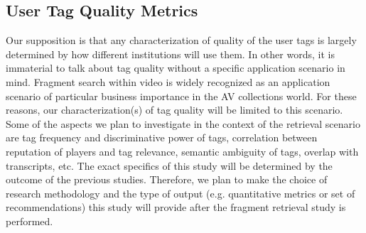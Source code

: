 

\subsection{User Tag Quality Metrics}\label{sec:quality}
Our supposition is that any characterization of quality of the user tags is largely determined by how different institutions will use them. In other words, it is immaterial to talk about tag quality without a specific application scenario in mind. Fragment search within video is widely recognized as an application scenario of particular business importance in the AV collections world. For these reasons, our characterization(s) of tag quality will be limited to this scenario.  Some of the aspects we plan to investigate in the context of the retrieval scenario are tag frequency and discriminative power of tags,  correlation between reputation of players and tag relevance,  semantic ambiguity of tags, overlap with transcripts,  etc. The exact specifics of this study will be determined by the outcome of the previous studies. Therefore, we plan to make the choice of research methodology and the type of output (e.g. quantitative metrics or set of recommendations) this study will provide after the fragment retrieval study is performed.

